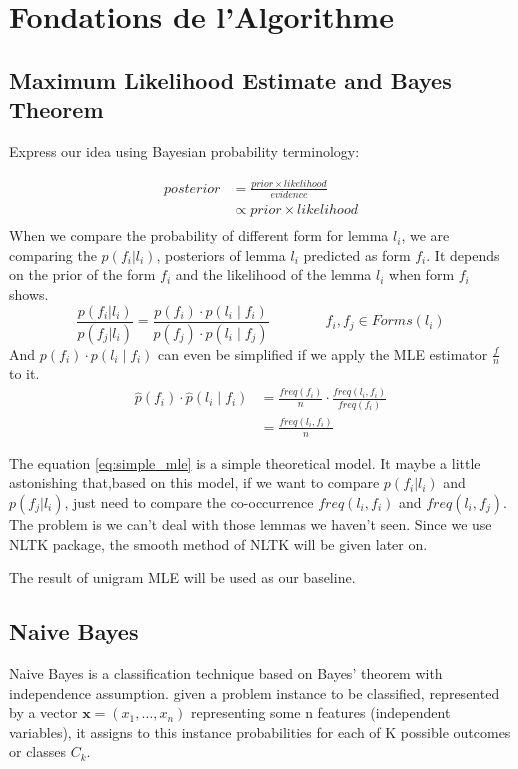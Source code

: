 \documentclass[a4paper]{article}
\begin{document}
\section{Fondations de l’Algorithme}
\subsection{Maximum Likelihood Estimate and Bayes Theorem}
Express our idea using Bayesian probability terminology:

\begin{align*}
posterior  &= \frac{prior \times likelihood}{evidence} \\
           &\propto  prior \times likelihood \\
\end{align*}
When we compare the probability of different form for lemma $l_i$, we are comparing the $p(f_i|l_i)$, posteriors  of lemma $l_i$ predicted as form $f_i$. It depends on the prior of the form $f_i$ and the likelihood of the lemma $l_i$ when form $f_i$ shows.
\begin{equation}
\frac{p(f_i|l_i)}{p(f_j|l_i)} = \frac{p(f_i) \cdot p(l_i \mid f_i)}{  p(f_j) \cdot p(l_i \mid f_j) } \qquad \qquad  f_i,f_j \in Forms(l_i)
\end{equation}
And $p(f_i) \cdot p(l_i \mid f_i)$ can even be simplified if we apply the MLE estimator $\frac{f}{n}$ to it.
\begin{equation} 
\label{eq:simple_mle}
\begin{aligned}
\hat{p}(f_i) \cdot \hat{p}(l_i \mid f_i) &= \frac{freq(f_i)}{n} \cdot \frac{freq(l_i, f_i)}{freq(f_i)} \\
&= \frac{freq(l_i, f_i)}{n}
\end{aligned}
\end{equation}

The equation \ref{eq:simple_mle} is a simple theoretical model. It maybe a little astonishing that,based on this model, if we want to compare $p(f_i|l_i)$ and $p(f_j|l_i)$, just need to compare the co-occurrence $freq(l_i,f_i)$ and $freq(l_i,f_j)$.  The problem is we can't deal with those lemmas we haven't seen. Since we use NLTK package, the smooth method of NLTK will be given later on. 

The result of unigram MLE will be used as our baseline.

\subsection{Naive Bayes}
Naive Bayes is a classification technique based on Bayes' theorem with independence assumption.  given a problem instance to be classified, represented by a vector ${\mathbf  {x}}=(x_{1},\dots ,x_{n})$ representing some n features (independent variables), it assigns to this instance probabilities for each of K possible outcomes or classes $C_{k}$. \cite{murty_pattern_2011}
\end{document}
